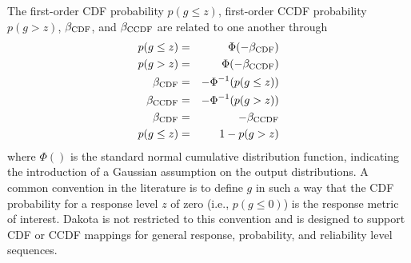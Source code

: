 The first-order CDF probability $p(g \le z)$, first-order 
CCDF probability $p(g > z)$, $\beta_{\rm CDF}$, and $\beta_{\rm CCDF}$ are
related to one another through
\begin{eqnarray}
p(g \le z)  & = & \Phi(-\beta_{\rm CDF})     \label{eq:p_cdf} \\
p(g > z)    & = & \Phi(-\beta_{\rm CCDF})    \label{eq:p_ccdf} \\
\beta_{\rm CDF}  & = & -\Phi^{-1}(p(g \le z)) \label{eq:beta_cdf} \\
\beta_{\rm CCDF} & = & -\Phi^{-1}(p(g > z))   \label{eq:beta_ccdf} \\
\beta_{\rm CDF}  & = & -\beta_{\rm CCDF}       \label{eq:beta_cdf_ccdf} \\
p(g \le z)  & = & 1 - p(g > z)             \label{eq:p_cdf_ccdf}
\end{eqnarray}
where $\Phi()$ is the standard normal cumulative distribution
function, indicating the introduction of a Gaussian assumption on the
output distributions.  A common convention in the literature is to
define $g$ in such a way that the CDF probability for a response level
$z$ of zero (i.e., $p(g \le 0)$) is the response metric of interest.
Dakota is not restricted to this convention and is designed to support
CDF or CCDF mappings for general response, probability, and
reliability level sequences.

